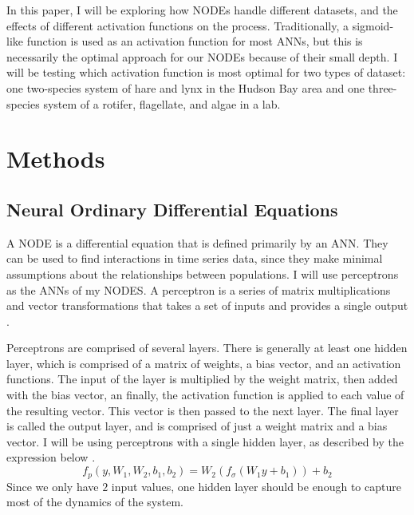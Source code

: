 \documentclass{article}
\begin{document}
In this paper, I will be exploring how NODEs handle different datasets, and the effects of different activation functions on the process. Traditionally, a sigmoid-like function is used as an activation function for most ANNs, but this is necessarily the optimal approach for our NODEs because of their small depth. I will be testing which activation function is most optimal for two types of dataset: one two-species system of hare and lynx in the Hudson Bay area and one three-species system of a rotifer, flagellate, and algae in a lab.

\section{Methods}

\subsection{Neural Ordinary Differential Equations}
A NODE is a differential equation that is defined primarily by an ANN. They can be used to find interactions in time series data, since they make minimal assumptions about the relationships between populations. I will use perceptrons as the ANNs of my NODES. A perceptron is a series of matrix multiplications and vector transformations that takes a set of inputs and provides a single output \cite{backproppaper}. 

Perceptrons are comprised of several layers. There is generally at least one hidden layer, which is comprised of a matrix of weights, a bias vector, and an activation functions. The input of the layer is multiplied by the weight matrix, then added with the bias vector, an finally, the activation function is applied to each value of the resulting vector. This vector is then passed to the next layer. The final layer is called the output layer, and is comprised of just a weight matrix and a bias vector. I will be using perceptrons with a single hidden layer, as described by the expression below \cite{backproppaper}.
$$f_p(y, W_1, W_2, b_1, b_2)=W_2(f_\sigma(W_1y+b_1))+b_2$$
Since we only have $2$ input values, one hidden layer should be enough to capture most of the dynamics of the system.
\end{document}
